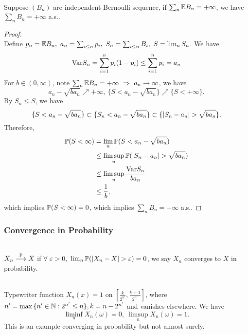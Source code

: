 \vspace{3pt}
\begin{corollary}\label{BCL2}\ \\
Suppose $(B_n)$ are independent Bernoulli sequence, if $\sum_n \E B_n = +\infty$, we have $\sum_n B_n = + \infty$ a.s..
\end{corollary}
\begin{proof}\ \\
Define $p_n = \E B_n,\ a_n = \sum_{i \leq n} p_i,\ S_n = \sum_{i \leq n} B_i,\ S = \lim_n S_n$. We have
\begin{equation*}
    \Var{S_n} = \summ{i=1}{n} p_i(1 - p_i) \leq \summ{i=1}{n} p_i = a_n
\end{equation*}
For $b \in (0,\infty)$, note $\sum_n \E B_n = +\infty\ \Rightarrow\ a_n \to \infty$, we have
\begin{equation*}
    a_n - \sqrt{b a_n} \nearrow +\infty,\ \{S < a_n - \sqrt{b a_n}\} \nearrow \{S < + \infty\}.
\end{equation*}
By $S_n \leq S$, we have
\begin{equation*}
    \{S < a_n - \sqrt{b a_n}\} \subset \{S_n < a_n - \sqrt{b a_n}\} \subset \{\abs{S_n - a_n} > \sqrt{b a_n}\}.
\end{equation*}
Therefore,
\begin{align*}
    \P(S < \infty) &= \lim_n \P(S < a_n - \sqrt{ba_n})\\
    &\leq \limsup_n \P(\abs{S_n - a_n} > \sqrt{b a_n})\\
    &\leq \limsup_n \frac{\Var{S_n}}{b a_n}\\
    &\leq \frac{1}{b},
\end{align*}
which implies $\P(S < \infty) = 0$, which implies $\sum_n B_n = +\infty$ a.s..
\end{proof}


\vspace{6pt}
\subsubsection{Convergence in Probability}    

\begin{definition}\ \\
$X_n \prto X$ if $\forall\ \vep  > 0,\ \lim_n \P(\abs{X_n - X} > \vep) = 0$, we say $X_n$ converges to $X$ in probability.
\end{definition}

\begin{example}\ \\
Typewriter function $X_n(x) = 1$ on $[\frac{k}{2^{n'}}, \frac{k + 1}{2^{n'}}]$, where $n' = \max{\{n' \in \N: 2^{n'} \leq n\}}, k = n - 2^{n'}$ and vanishes elsewhere. We have
\begin{equation*}
    \liminf_n X_n(\omega) = 0,\ \limsup_n X_n(\omega) = 1.
\end{equation*}
This is an example converging in probability but not almost surely.
\end{example}

